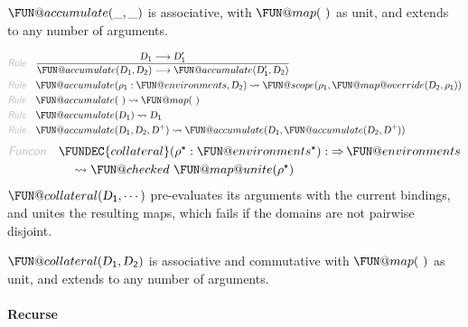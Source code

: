 $\FUN@accumulate
    (  \_, 
           \_ )$ is associative, with $\FUN@map
    (   \  )$ as unit, and extends to any
  number of arguments.

\begin{align*}
  \KEY{Rule} \quad
    & \frac{
       \VAR{D}\SUB{1} \TRANS 
        \VAR{D}\SUB{1}'
      }{
       \FUN@accumulate
                    (  \VAR{D}\SUB{1}, 
                           \VAR{D}\SUB{2} ) \TRANS 
        \FUN@accumulate
          (  \VAR{D}\SUB{1}', 
                 \VAR{D}\SUB{2} )
      }
\\
  \KEY{Rule} \quad
    & \FUN@accumulate
        (  \VAR{\ensuremath{\rho}}\SUB{1} : \FUN@environments, 
               \VAR{D}\SUB{2} ) \leadsto 
        \FUN@scope
          (  \VAR{\ensuremath{\rho}}\SUB{1}, 
                 \FUN@map@override
                  (  \VAR{D}\SUB{2}, 
                         \VAR{\ensuremath{\rho}}\SUB{1} ) )
\\
  \KEY{Rule} \quad
    & \FUN@accumulate
        (   \  ) \leadsto 
        \FUN@map
          (   \  )
\\
  \KEY{Rule} \quad
    & \FUN@accumulate
        (  \VAR{D}\SUB{1} ) \leadsto 
        \VAR{D}\SUB{1}
\\
  \KEY{Rule} \quad
    & \FUN@accumulate
        (  \VAR{D}\SUB{1}, 
               \VAR{D}\SUB{2}, 
               \VAR{D}\PLUS ) \leadsto 
        \FUN@accumulate
          (  \VAR{D}\SUB{1}, 
                 \FUN@accumulate
                  (  \VAR{D}\SUB{2}, 
                         \VAR{D}\PLUS ) )
\end{align*}
\begin{align*}
  \KEY{Funcon} \quad
  & \FUNDEC{collateral}(
                     \VAR{\ensuremath{\rho}}\STAR : \FUN@environments\STAR) 
    :  \TO \FUN@environments \\&\quad
    \leadsto \FUN@checked \ 
               \FUN@map@unite
                 (  \VAR{\ensuremath{\rho}}\STAR )
\end{align*}
$\FUN@collateral
    (  \VAR{D}\SUB{1}, 
           \cdots )$ pre-evaluates its arguments with the current bindings,
  and unites the resulting maps, which fails if the domains are not pairwise
  disjoint.

$\FUN@collateral
    (  \VAR{D}\SUB{1}, 
           \VAR{D}\SUB{2} )$ is associative and commutative with $\FUN@map
    (   \  )$ as unit, 
  and extends to any number of arguments.

\paragraph{Recurse}\hypertarget{recurse}{}\label{recurse}

